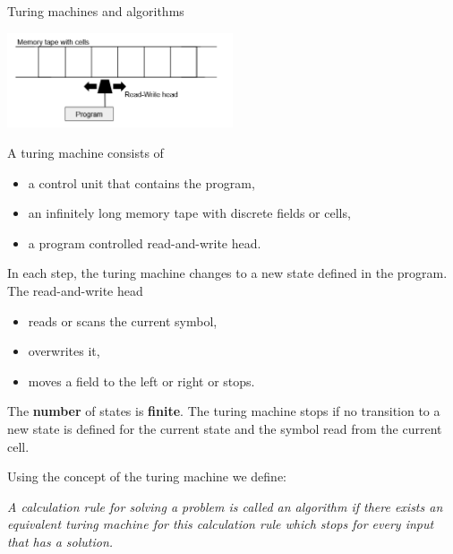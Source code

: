 \documentclass[11pt,compress,t,notes=noshow, xcolor=table]{beamer}
\begin{document}
\begin{vbframe}{Turing machines and algorithms}

\begin{center}
\includegraphics[width=0.5\textwidth]{figure_man/turingmachine.png}
\end{center}

A turing machine consists of

\begin{itemize}
\item a control unit that contains the program,
\item an infinitely long memory tape with discrete fields or cells,
\item a program controlled read-and-write head.
\end{itemize}


\framebreak

In each step, the turing machine changes to a new state defined in the program. The read-and-write head

\begin{itemize}
\item reads or scans the current symbol,
\item overwrites it,
\item moves a field to the left or right or stops.
\end{itemize}

The \textbf{number} of states is \textbf{finite}. The turing machine stops if no transition to a new state is defined for the current state and the symbol read from the current cell.


\framebreak

Using the concept of the turing machine we define:

\begin{center}
\begin{minipage}{0.9\textwidth}
\emph{A calculation rule for solving a problem is called an algorithm if there exists an equivalent turing machine for this calculation rule which stops for every input that has a solution.} \\
\end{minipage}
\end{center}


\end{vbframe}
\end{document}
